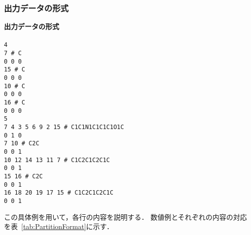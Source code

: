 \documentclass[11pt,titlepage,dvipdfmx,twoside]{jarticle}
\begin{document}
\subsubsection{出力データの形式}
\label{sec:OutputFormat_p}

\begin{oframed}
	{\bf 出力データの形式}\\\\
	{\tt 4 \\
	7 \# C \\
	0 0 0 \\
	15 \# C \\
	0 0 0 \\
	10 \# C \\
	0 0 0 \\
	16 \# C \\
	0 0 0 \\
	5 \\
	7 4 3 5 6 9 2 15 \# C1C1N1C1C1C1O1C \\
	0 1 0 \\
	7 10 \# C2C \\
	0 0 1 \\
	10 12 14 13 11 7 \# C1C2C1C2C1C \\
	0 0 1 \\
	15 16 \# C2C \\
	0 0 1 \\
	16 18 20 19 17 15 \# C1C2C1C2C1C \\
	0 0 1 \\}
	\end{oframed}

	この具体例を用いて，各行の内容を説明する．
	数値例とそれぞれの内容の対応を表~\ref{tab:PartitionFormat}に示す．
\end{document}
